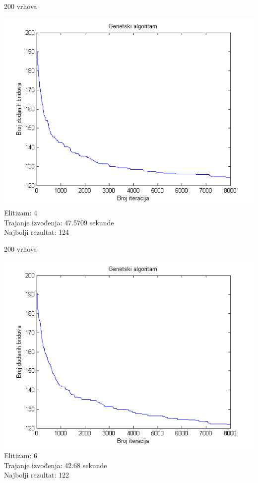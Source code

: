 \documentclass{beamer}
\begin{document}
\begin{frame}{200 vrhova}
\begin{center}
\includegraphics[scale = 0.55]{par4.png}\\
\tiny
Elitizam: 4\\
Trajanje izvođenja: 47.5709 sekunde\\
Najbolji rezultat: 124\\
\end{center}
\end{frame}


\begin{frame}{200 vrhova}
\begin{center}
\includegraphics[scale = 0.55]{par6.png}\\
\tiny
Elitizam: 6\\
Trajanje izvođenja: 42.68 sekunde\\
Najbolji rezultat: 122\\
\end{center}
\end{frame}
\end{document}
